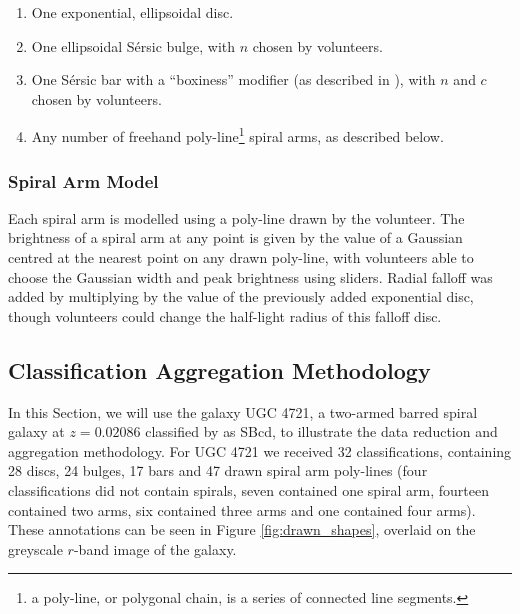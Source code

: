 \documentclass[trackchanges]{aastex63}
\begin{document}
\begin{enumerate}
\item One exponential, ellipsoidal disc.
\item One ellipsoidal S\'ersic bulge, with $n$ chosen by volunteers.
\item One S\'ersic bar with a ``boxiness'' modifier (as described in \citealt{galfit-paper}), with $n$ and $c$ chosen by volunteers.
\item Any number of freehand poly-line\footnote{a poly-line, or polygonal chain, is a series of connected line segments.} spiral arms, as described below.
\end{enumerate}

\subsubsection{Spiral Arm Model}
Each spiral arm is modelled using a poly-line drawn by the volunteer. The brightness of a spiral arm at any point is given by the value of a Gaussian centred at the nearest point on any drawn poly-line, with volunteers able to choose the Gaussian width and peak brightness using sliders. Radial falloff was added by multiplying by the value of the previously added exponential disc, though volunteers could change the half-light radius of this falloff disc.

\subsection{Classification Aggregation Methodology}

In this Section, we will use the galaxy UGC 4721, a two-armed barred spiral galaxy at $z=0.02086$ classified by \citet{deVaucouleurs1991} as SBcd, to illustrate the data reduction and aggregation methodology. For UGC 4721 we received 32 classifications, containing 28 discs, 24 bulges, 17 bars and 47 drawn spiral arm poly-lines (four classifications did not contain spirals, seven contained one spiral arm, fourteen contained two arms, six contained three arms and one contained four arms). These annotations can be seen in Figure \ref{fig:drawn_shapes}, overlaid on the greyscale $r$-band image of the galaxy.

\begin{figure*}
  \caption{Components drawn by volunteers for UGC 4721. The top left panel shows drawn discs, top right shows drawn bulges, bottom left shows drawn bars and bottom right shows drawn spiral arms. Discs, bulges and bars are displayed at twice their effective radii. These raw marks are subsequently aggregated to produce a consensus value for each galaxy component.}
  \label{fig:drawn_shapes}
\end{figure*}
\end{document}
